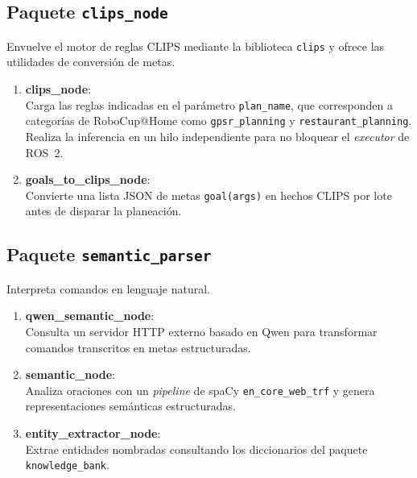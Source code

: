 
\subsection{Paquete \texttt{clips\_node}}
Envuelve el motor de reglas CLIPS mediante la biblioteca \texttt{clips} y ofrece las utilidades de conversión de metas.

\begin{enumerate}
    \item \textbf{clips\_node}: \\
    Carga las reglas indicadas en el parámetro \texttt{plan\_name}, que corresponden a categorías de RoboCup@Home como \texttt{gpsr\_planning} y \texttt{restaurant\_planning}. Realiza la inferencia en un hilo independiente para no bloquear el \textit{executor} de ROS~2.

    \item \textbf{goals\_to\_clips\_node}: \\
    Convierte una lista JSON de metas \texttt{goal(args)} en hechos CLIPS por lote antes de disparar la planeación.
\end{enumerate}


\subsection{Paquete \texttt{semantic\_parser}}
Interpreta comandos en lenguaje natural.

\begin{enumerate}
    \item \textbf{qwen\_semantic\_node}: \\
    Consulta un servidor HTTP externo basado en Qwen para transformar comandos transcritos en metas estructuradas.

    \item \textbf{semantic\_node}: \\
    Analiza oraciones con un \textit{pipeline} de spaCy \texttt{en\_core\_web\_trf} y genera representaciones semánticas estructuradas.

    \item \textbf{entity\_extractor\_node}: \\
    Extrae entidades nombradas consultando los diccionarios del paquete \texttt{knowledge\_bank}.
\end{enumerate}

